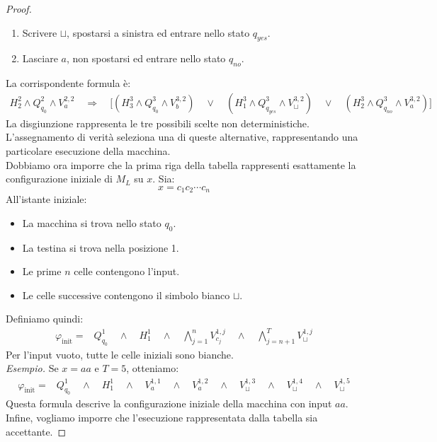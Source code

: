 \begin{proof}
\begin{enumerate}
    \item Scrivere $\sqcup$, spostarsi a sinistra
    ed entrare nello stato $q_{yes}$.

    \item Lasciare $a$, non spostarsi
    ed entrare nello stato $q_{no}$.
\end{enumerate}
La corrispondente formula è:
\[
\begin{aligned}
H_2^2\land Q_{q_0}^2\land V_a^{2,2}
\quad
\Rightarrow
\quad
\bigg[
(H_3^3\land Q_{q_0}^3\land V_b^{3,2})
\quad\lor\quad
(H_1^3\land Q_{q_{yes}}^3\land V_{\sqcup}^{3,2})
\quad\lor\quad
(H_2^3\land Q_{q_{no}}^3\land V_a^{3,2})
\bigg]
\end{aligned}
\]
La disgiunzione rappresenta le tre possibili
scelte non deterministiche.
L'assegnamento di verità seleziona una
di queste alternative, rappresentando
una particolare esecuzione della macchina.\smallskip\\
Dobbiamo ora imporre che la prima riga della
tabella rappresenti esattamente la
configurazione iniziale di $M_L$ su $x$.
Sia:
\[
x=c_1c_2\cdots c_n
\]
All'istante iniziale:
\begin{itemize}
    \item La macchina si trova nello stato $q_0$.
    \item La testina si trova nella posizione 1.
    \item Le prime $n$ celle contengono l'input.
    \item Le celle successive contengono il
    simbolo bianco $\sqcup$.
\end{itemize}
Definiamo quindi:
\[
\boxed{
\begin{aligned}
\varphi_{\text{init}}={}&
Q_{q_0}^{1}\quad\land\quad H_1^1
\quad
\land
\quad
\bigwedge_{j=1}^{n}V_{c_j}^{1,j}
\quad
\land
\quad
\bigwedge_{j=n+1}^{T}V_{\sqcup}^{1,j}
\end{aligned}
}
\]
Per l'input vuoto, tutte le celle iniziali
sono bianche.\smallskip\\
\textit{Esempio.}
Se $x=aa$ e $T=5$, otteniamo:
\[
\begin{aligned}
\varphi_{\text{init}}={}&
Q_{q_0}^{1} \quad\land\quad H_1^1
\quad\land \quad V_a^{1,1}
\quad\land\quad V_a^{1,2}
\quad
\land\quad V_{\sqcup}^{1,3}
\quad\land\quad V_{\sqcup}^{1,4}
\quad\land \quad V_{\sqcup}^{1,5}
\end{aligned}
\]
Questa formula descrive la configurazione
iniziale della macchina con input $aa$.\smallskip\\
Infine, vogliamo imporre che l'esecuzione
rappresentata dalla tabella sia accettante.

\end{proof}
